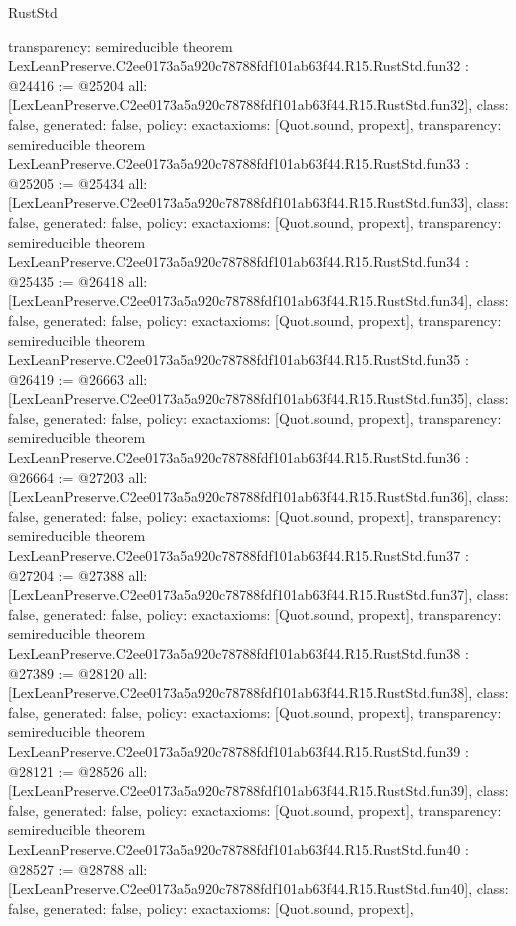 \begin{lexlean}{RustStd}
\begin{coremodule}
{  transparency: semireducible
}
theorem LexLeanPreserve.C2ee0173a5a920c78788fdf101ab63f44.R15.RustStd.fun32 : @24416 := @25204 {
  all: [LexLeanPreserve.C2ee0173a5a920c78788fdf101ab63f44.R15.RustStd.fun32],
  class: false,
  generated: false,
  policy: exact{axioms: [Quot.sound, propext]},
  transparency: semireducible
}
theorem LexLeanPreserve.C2ee0173a5a920c78788fdf101ab63f44.R15.RustStd.fun33 : @25205 := @25434 {
  all: [LexLeanPreserve.C2ee0173a5a920c78788fdf101ab63f44.R15.RustStd.fun33],
  class: false,
  generated: false,
  policy: exact{axioms: [Quot.sound, propext]},
  transparency: semireducible
}
theorem LexLeanPreserve.C2ee0173a5a920c78788fdf101ab63f44.R15.RustStd.fun34 : @25435 := @26418 {
  all: [LexLeanPreserve.C2ee0173a5a920c78788fdf101ab63f44.R15.RustStd.fun34],
  class: false,
  generated: false,
  policy: exact{axioms: [Quot.sound, propext]},
  transparency: semireducible
}
theorem LexLeanPreserve.C2ee0173a5a920c78788fdf101ab63f44.R15.RustStd.fun35 : @26419 := @26663 {
  all: [LexLeanPreserve.C2ee0173a5a920c78788fdf101ab63f44.R15.RustStd.fun35],
  class: false,
  generated: false,
  policy: exact{axioms: [Quot.sound, propext]},
  transparency: semireducible
}
theorem LexLeanPreserve.C2ee0173a5a920c78788fdf101ab63f44.R15.RustStd.fun36 : @26664 := @27203 {
  all: [LexLeanPreserve.C2ee0173a5a920c78788fdf101ab63f44.R15.RustStd.fun36],
  class: false,
  generated: false,
  policy: exact{axioms: [Quot.sound, propext]},
  transparency: semireducible
}
theorem LexLeanPreserve.C2ee0173a5a920c78788fdf101ab63f44.R15.RustStd.fun37 : @27204 := @27388 {
  all: [LexLeanPreserve.C2ee0173a5a920c78788fdf101ab63f44.R15.RustStd.fun37],
  class: false,
  generated: false,
  policy: exact{axioms: [Quot.sound, propext]},
  transparency: semireducible
}
theorem LexLeanPreserve.C2ee0173a5a920c78788fdf101ab63f44.R15.RustStd.fun38 : @27389 := @28120 {
  all: [LexLeanPreserve.C2ee0173a5a920c78788fdf101ab63f44.R15.RustStd.fun38],
  class: false,
  generated: false,
  policy: exact{axioms: [Quot.sound, propext]},
  transparency: semireducible
}
theorem LexLeanPreserve.C2ee0173a5a920c78788fdf101ab63f44.R15.RustStd.fun39 : @28121 := @28526 {
  all: [LexLeanPreserve.C2ee0173a5a920c78788fdf101ab63f44.R15.RustStd.fun39],
  class: false,
  generated: false,
  policy: exact{axioms: [Quot.sound, propext]},
  transparency: semireducible
}
theorem LexLeanPreserve.C2ee0173a5a920c78788fdf101ab63f44.R15.RustStd.fun40 : @28527 := @28788 {
  all: [LexLeanPreserve.C2ee0173a5a920c78788fdf101ab63f44.R15.RustStd.fun40],
  class: false,
  generated: false,
  policy: exact{axioms: [Quot.sound, propext]},
}
\end{coremodule}
\end{lexlean}

